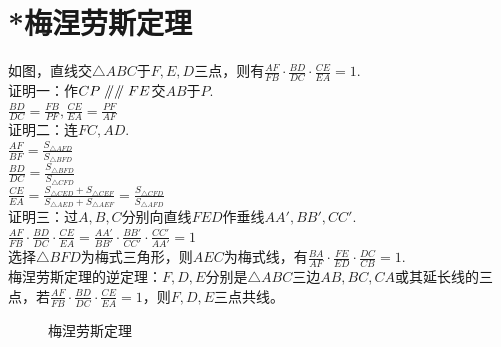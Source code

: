 \section{*梅涅劳斯定理}
\begin{definition}
    如图，直线交$\triangle ABC$于$F,E,D$三点，则有$\frac{AF}{FB}·\frac{BD}{DC}·\frac{CE}{EA}=1$. \\
    证明一：作$CP\mathrel{/\mkern-5mu/} \mathrel{/\mkern-5mu/} FE$交$AB$于$P$. \\
    $\frac{BD}{DC}=\frac{FB}{PF},\frac{CE}{EA}=\frac{PF}{AF}$ \\
    证明二：连$FC,AD$. \\
    $\frac{AF}{BF}=\frac{S_{\triangle AFD}}{S_{\triangle BFD}}$ \\
    $\frac{BD}{DC}=\frac{S_{\triangle BFD}}{S_{\triangle CFD}}$ \\
    $\frac{CE}{EA}=\frac{S_{\triangle CED}+S_{\triangle CEF}}{S_{\triangle AED}+S_{\triangle AEF}}=\frac{S_{\triangle CFD}}{S_{\triangle AFD}}$ \\
    证明三：过$A,B,C$分别向直线$FED$作垂线$AA',BB',CC'$. \\
    $\frac{AF}{FB}·\frac{BD}{DC}·\frac{CE}{EA}=\frac{AA'}{BB'}·\frac{BB'}{CC'}·\frac{CC'}{AA'}=1$ \\
    选择$\triangle BFD$为梅式三角形，则$AEC$为梅式线，有$\frac{BA}{AF}·\frac{FE}{ED}·\frac{DC}{CB}=1$. \\
    梅涅劳斯定理的逆定理：$F,D,E$分别是$\triangle ABC$三边$AB,BC,CA$或其延长线的三点，若$\frac{AF}{FB}·\frac{BD}{DC}·\frac{CE}{EA}=1$，则$F,D,E$三点共线。\\
\end{definition}
\begin{figure}[H]
    \centering
    \resizebox{4cm}{!}{}
\end{figure}
\begin{figure}[H]
    \centering
    \resizebox{4cm}{!}{}
\end{figure}
\begin{figure}[H]
    \centering
    \resizebox{4cm}{!}{}
    \caption{梅涅劳斯定理}
\end{figure}
\clearpage
